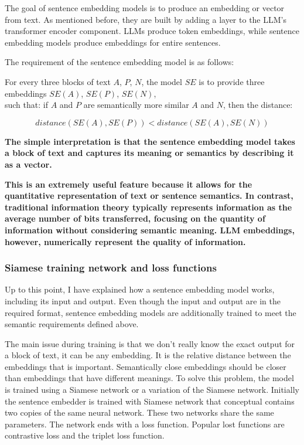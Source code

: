 \documentclass{wseas}
\begin{document}
The goal of sentence embedding models is to produce an embedding or
vector from text. As mentioned before, they are built by adding a layer
to the LLM's transformer encoder component. LLMs produce token
embeddings, while sentence embedding models produce embeddings for
entire sentences.

The requirement of the sentence embedding model is as follows:

For every three blocks of text \(A\), \(P\), \(N\), the model \(SE\) is
to provide three embeddings \(SE(A)\), \(SE(P)\), \(SE(N)\),\\
such that: if \(A\) and \(P\) are semantically more similar \(A\) and
\(N\), then the distance: 

\begin{equation}
   distance(SE(A), SE(P)) < distance(SE(A), SE(N))
\end{equation}

\textbf{The simple interpretation is that the sentence embedding model
takes a block of text and captures its meaning or semantics by
describing it as a vector.}

\textbf{This is an extremely useful feature because it allows for the 
quantitative representation of text or sentence semantics. In contrast, 
traditional information theory typically represents information as the 
average number of bits transferred, focusing on the quantity of information 
without considering semantic meaning. LLM embeddings, however, numerically 
represent the quality of information.}

\subsubsection{Siamese training network and loss functions}

Up to this point, I have explained how a sentence embedding model works,
including its input and output. Even though the input and output are in
the required format, sentence embedding models are additionally trained
to meet the semantic requirements defined above.

The main issue during training is that we don't really know the exact
output for a block of text, it can be any embedding. It is the relative
distance between the embeddings that is important. Semantically close
embeddings should be closer than embeddings that have different
meanings. To solve this problem, the model is trained using a Siamese
network or a variation of the Siamese network. Initially the sentence
embedder is trained with Siamese network that conceptual contains two
copies of the same neural network. These two networks share the same
parameters. The network ends with a loss function. Popular lost
functions are contrastive loss and the triplet loss function.
\end{document}
